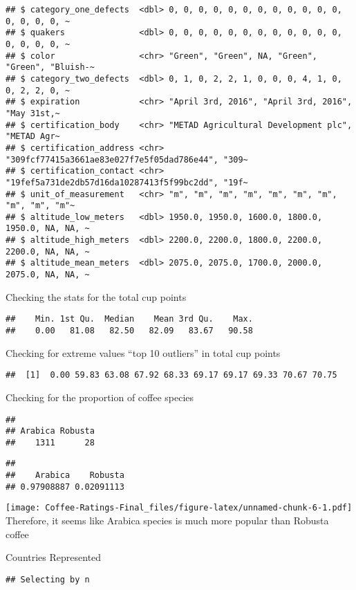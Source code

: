 \documentclass[
]{article}
\begin{document}
\begin{verbatim}
## $ category_one_defects  <dbl> 0, 0, 0, 0, 0, 0, 0, 0, 0, 0, 0, 0, 0, 0, 0, 0, ~
## $ quakers               <dbl> 0, 0, 0, 0, 0, 0, 0, 0, 0, 0, 0, 0, 0, 0, 0, 0, ~
## $ color                 <chr> "Green", "Green", NA, "Green", "Green", "Bluish-~
## $ category_two_defects  <dbl> 0, 1, 0, 2, 2, 1, 0, 0, 0, 4, 1, 0, 0, 2, 2, 0, ~
## $ expiration            <chr> "April 3rd, 2016", "April 3rd, 2016", "May 31st,~
## $ certification_body    <chr> "METAD Agricultural Development plc", "METAD Agr~
## $ certification_address <chr> "309fcf77415a3661ae83e027f7e5f05dad786e44", "309~
## $ certification_contact <chr> "19fef5a731de2db57d16da10287413f5f99bc2dd", "19f~
## $ unit_of_measurement   <chr> "m", "m", "m", "m", "m", "m", "m", "m", "m", "m"~
## $ altitude_low_meters   <dbl> 1950.0, 1950.0, 1600.0, 1800.0, 1950.0, NA, NA, ~
## $ altitude_high_meters  <dbl> 2200.0, 2200.0, 1800.0, 2200.0, 2200.0, NA, NA, ~
## $ altitude_mean_meters  <dbl> 2075.0, 2075.0, 1700.0, 2000.0, 2075.0, NA, NA, ~
\end{verbatim}

Checking the stats for the total cup points

\begin{verbatim}
##    Min. 1st Qu.  Median    Mean 3rd Qu.    Max. 
##    0.00   81.08   82.50   82.09   83.67   90.58
\end{verbatim}

Checking for extreme values ``top 10 outliers'' in total cup points

\begin{verbatim}
##  [1]  0.00 59.83 63.08 67.92 68.33 69.17 69.17 69.33 70.67 70.75
\end{verbatim}

Checking for the proportion of coffee species

\begin{verbatim}
## 
## Arabica Robusta 
##    1311      28
\end{verbatim}

\begin{verbatim}
## 
##    Arabica    Robusta 
## 0.97908887 0.02091113
\end{verbatim}

\texttt{[image: Coffee-Ratings-Final\_files/figure-latex/unnamed-chunk-6-1.pdf]}
Therefore, it seems like Arabica species is much more popular than
Robusta coffee

Countries Represented

\begin{verbatim}
## Selecting by n
\end{verbatim}
\end{document}
